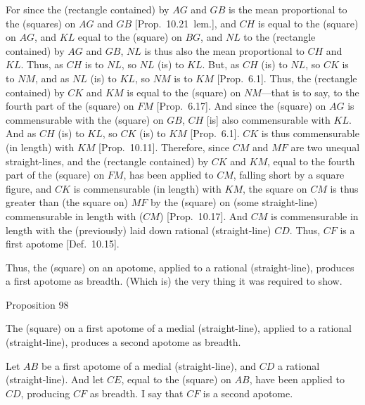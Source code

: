 For since the (rectangle contained) by $AG$ and $GB$ is the
mean proportional to the (squares) on $AG$ and $GB$ [Prop.~10.21~lem.], and $CH$ is equal
to the (square) on $AG$, and $KL$ equal to the (square) on 
$BG$, and $NL$ to the (rectangle contained) by $AG$ and $GB$,
$NL$ is thus also the mean proportional to $CH$ and $KL$. Thus,
as $CH$ is to $NL$, so $NL$ (is) to $KL$. But, as $CH$ (is) to
$NL$, so $CK$ is to $NM$, and as $NL$ (is) to $KL$, so
$NM$ is to $KM$ [Prop.~6.1]. 
Thus, the (rectangle contained) by $CK$ and $KM$
is equal to the (square) on $NM$---that is to say, to the fourth
part of the (square) on $FM$ [Prop.~6.17]. 
And since the (square) on $AG$ is commensurable with the
(square) on $GB$, $CH$ [is] also commensurable with
$KL$. And as $CH$ (is) to $KL$, so $CK$ (is) to $KM$ [Prop.~6.1]. $CK$ is thus
commensurable (in length) with $KM$ [Prop.~10.11].  Therefore, since $CM$ and
$MF$ are two unequal straight-lines, and the (rectangle
contained) by $CK$ and $KM$, equal to the fourth part of the
(square) on $FM$, has been applied to $CM$, falling short by a square figure, and $CK$ is commensurable
(in length) with $KM$,  the square on $CM$ is thus greater than
(the square on) $MF$ by the (square) on (some straight-line)
commensurable in length with ($CM$) [Prop.~10.17]. 
And $CM$ is commensurable in length with the (previously) laid down rational (straight-line) $CD$. Thus, $CF$ is a first apotome [Def.~10.15].

Thus, the (square) on an apotome, applied to a rational (straight-line),
produces  a first apotome as breadth. (Which is) the very thing it was required to show.


\begin{center}
{\large Proposition 98}
\end{center}

The (square) on a first apotome of
a medial (straight-line), applied to a rational (straight-line), produces
 a second apotome as breadth.
  
Let $AB$ be a first apotome of a medial (straight-line), and
$CD$ a rational (straight-line). And let $CE$, equal to the (square) on
$AB$, have been applied to $CD$, producing
$CF$ as breadth. I say that $CF$ is a second apotome.

